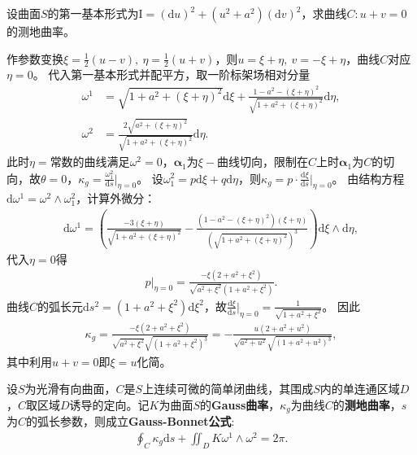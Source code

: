 \documentclass[../../main.tex]{subfiles}%
\begin{document}
\begin{example}
设曲面$S$的第一基本形式为$\mathrm{I}=(\mathrm{d}u)^2+(u^2+a^2)(\mathrm{d}v)^2$，求曲线$C:u+v=0$的测地曲率。
\end{example}
\begin{solution}
作参数变换$\xi=\frac{1}{2}(u-v),\ \eta=\frac{1}{2}(u+v)$，则$u=\xi+\eta,\ v=-\xi+\eta$，曲线$C$对应$\eta=0$。
代入第一基本形式并配平方，取一阶标架场相对分量
\begin{align*}
\omega^1&=\sqrt{1+a^2+(\xi+\eta)^2}\mathrm{d}\xi+\frac{1-a^2-(\xi+\eta)^2}{\sqrt{1+a^2+(\xi+\eta)^2}}\mathrm{d}\eta,\\
\omega^2&=\frac{2\sqrt{a^2+(\xi+\eta)^2}}{\sqrt{1+a^2+(\xi+\eta)^2}}\mathrm{d}\eta.
\end{align*}
此时$\eta=$常数的曲线满足$\omega^2=0$，$\boldsymbol{\alpha}_1$为$\xi-$曲线切向，限制在$C$上时$\boldsymbol{\alpha}_1$为$C$的切向，故$\theta=0$，$\kappa_g=\frac{\omega_1^2}{\mathrm{d}s}\big|_{\eta=0}$。
设$\omega_1^2=p\mathrm{d}\xi+q\mathrm{d}\eta$，则$\kappa_g=p\cdot\frac{\mathrm{d}\xi}{\mathrm{d}s}\big|_{\eta=0}$。
由结构方程$\mathrm{d}\omega^1=\omega^2\wedge\omega_1^2$，计算外微分：
\begin{align*}
\mathrm{d}\omega^1=\left(\frac{-3(\xi+\eta)}{\sqrt{1+a^2+(\xi+\eta)^2}}-\frac{(1-a^2-(\xi+\eta)^2)(\xi+\eta)}{\left(\sqrt{1+a^2+(\xi+\eta)^2}\right)^3}\right)\mathrm{d}\xi\wedge\mathrm{d}\eta,
\end{align*}
代入$\eta=0$得
\begin{align*}
p\big|_{\eta=0}=\frac{-\xi(2+a^2+\xi^2)}{\sqrt{a^2+\xi^2}(1+a^2+\xi^2)}.
\end{align*}
曲线$C$的弧长元$\mathrm{d}s^2=(1+a^2+\xi^2)\mathrm{d}\xi^2$，故$\frac{\mathrm{d}\xi}{\mathrm{d}s}\big|_{\eta=0}=\frac{1}{\sqrt{1+a^2+\xi^2}}$。
因此
\begin{align*}
\kappa_g=\frac{-\xi(2+a^2+\xi^2)}{\sqrt{a^2+\xi^2}\sqrt{(1+a^2+\xi^2)^3}}=-\frac{u(2+a^2+u^2)}{\sqrt{a^2+u^2}\sqrt{(1+a^2+u^2)^3}},
\end{align*}
其中利用$u+v=0$即$\xi=u$化简。

\end{solution}

\begin{theorem}
设$S$为光滑有向曲面，$C$是$S$上连续可微的简单闭曲线，其围成$S$内的单连通区域$D$，$C$取区域$D$诱导的定向。记$K$为曲面$S$的\textbf{Gauss曲率}，$\kappa_g$为曲线$C$的\textbf{测地曲率}，$s$为$C$的弧长参数，则成立\textbf{Gauss-Bonnet公式}:
\begin{align}
\oint_C \kappa_g \mathrm{d}s + \iint_D K \omega^1 \land \omega^2 = 2\pi. \label{eq:gauss_bonnet_single}
\end{align}
\end{theorem}
\end{document}
